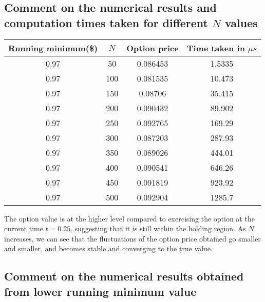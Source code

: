 \subsection{Comment on the numerical results and computation times taken for different $N$ values}

\begin{center}
	\begin{tabular}{| c | c | c | c |}
		\hline Running minimum(\$) & $N$ & Option price & Time taken in $\mu s$\\
		[0.5ex]
		\hline 0.97 & 50 & 0.086453 & 1.5335 \\
		\hline 0.97 & 100 & 0.081535 & 10.473 \\
		\hline 0.97 & 150 & 0.08706 & 35.415 \\
		\hline 0.97 & 200 & 0.090432 & 89.902 \\
		\hline 0.97 & 250 & 0.092765 & 169.29 \\
		\hline 0.97 & 300 & 0.087203 & 287.93 \\
		\hline 0.97 & 350 & 0.089026 & 444.01 \\
		\hline 0.97 & 400 & 0.090541 & 646.26 \\
		\hline 0.97 & 450 & 0.091819 & 923.92 \\
		\hline 0.97 & 500 & 0.092904 & 1285.7 \\
		\hline
	\end{tabular}
\end{center}

The option value is at the higher level compared to exercising the option at the current time $t = 0.25$, suggesting that it is still within the holding region. As $N$ increases, we can see that the fluctuations of the option price obtained go smaller and smaller, and becomes stable and converging to the true value.

\subsection{Comment on the numerical results obtained from lower running minimum value}

